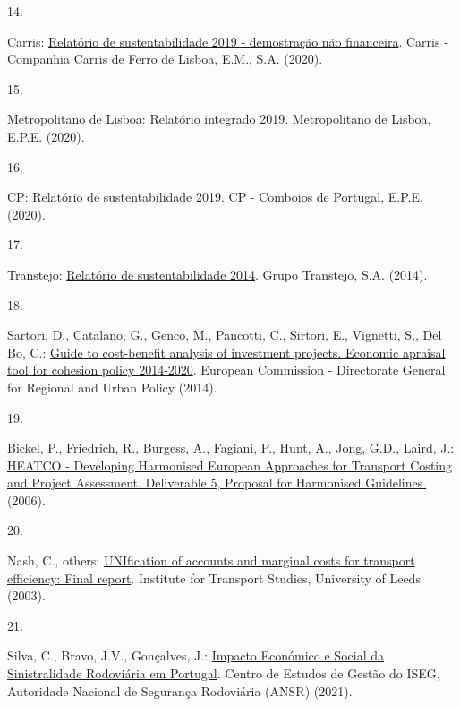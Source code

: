 \documentclass[runningheads]{llncs}
\newlength{\cslhangindent}
\newlength{\csllabelwidth}
\newlength{\cslentryspacingunit} %
\newenvironment{CSLReferences}[2] %
 {%
  \setlength{\parindent}{0pt}
  \ifodd #1
  \let\oldpar\par
  \def\par{\hangindent=\cslhangindent\oldpar}
  \fi
  \setlength{\parskip}{#2\cslentryspacingunit}
 }%
 {}
\newcommand{\CSLLeftMargin}[1]{\parbox[t]{\csllabelwidth}{#1}}
\newcommand{\CSLRightInline}[1]{\parbox[t]{\linewidth - \csllabelwidth}{#1}\break}
\begin{document}
\begin{CSLReferences}{0}{0}
\leavevmode{}%
\CSLLeftMargin{14. }%
\CSLRightInline{Carris:
\href{https://www.carris.pt/media/dkdp2wbg/dnf_carris2019_rv5.pdf}{Relatório
de sustentabilidade 2019 - demostração não financeira}. {Carris -
Companhia Carris de Ferro de Lisboa, E.M., S.A.} (2020).}

\leavevmode{}%
\CSLLeftMargin{15. }%
\CSLRightInline{Metropolitano de Lisboa:
\href{https://www.metrolisboa.pt/wp-content/uploads/2021/01/relatorio_integrado_2019.pdf}{Relatório
integrado 2019}. {Metropolitano de Lisboa, E.P.E.} (2020).}

\leavevmode{}%
\CSLLeftMargin{16. }%
\CSLRightInline{CP:
\href{https://www.cp.pt/StaticFiles/Institucional/2_gestao_sustentavel/1_RelatoriosSustentabilidade/relatorio-de-sustentabilidade-2019.pdf}{Relatório
de sustentabilidade 2019}. {CP - Comboios de Portugal, E.P.E.} (2020).}

\leavevmode{}%
\CSLLeftMargin{17. }%
\CSLRightInline{Transtejo:
\href{https://ttsl.pt/wp-content/uploads/2018/01/rs_2014_min.pdf}{Relatório
de sustentabilidade 2014}. {Grupo Transtejo, S.A.} (2014).}

\leavevmode{}%
\CSLLeftMargin{18. }%
\CSLRightInline{Sartori, D., Catalano, G., Genco, M., Pancotti, C.,
Sirtori, E., Vignetti, S., Del Bo, C.:
\href{https://ec.europa.eu/regional_policy/sources/docgener/studies/pdf/cba_guide.pdf}{Guide
to cost-benefit analysis of investment projects. Economic apraisal tool
for cohesion policy 2014-2020}. {European Commission - Directorate
General for Regional and Urban Policy} (2014).}

\leavevmode{}%
\CSLLeftMargin{19. }%
\CSLRightInline{Bickel, P., Friedrich, R., Burgess, A., Fagiani, P.,
Hunt, A., Jong, G.D., Laird, J.:
\href{https://trimis.ec.europa.eu/sites/default/files/project/documents/20130122_113653_88902_HEATCO_D5_summary.pdf}{{HEATCO
- Developing Harmonised European Approaches for Transport Costing and
Project Assessment. Deliverable 5, Proposal for Harmonised Guidelines.}}
(2006).}

\leavevmode{}%
\CSLLeftMargin{20. }%
\CSLRightInline{Nash, C., others:
\href{https://www.its.leeds.ac.uk/projects/unite/downloads/Unite\%20Final\%20Report.pdf}{UNIfication
of accounts and marginal costs for transport efficiency: Final report}.
{Institute for Transport Studies, University of Leeds} (2003).}

\leavevmode{}%
\CSLLeftMargin{21. }%
\CSLRightInline{Silva, C., Bravo, J.V., Gonçalves, J.:
\href{http://www.ansr.pt/Estatisticas/RelatoriosTematicos/Documents/O\%20Impacto\%20Economico\%20e\%20Social\%20da\%20Sinistralidade\%20-\%20PT.pdf}{{Impacto
Económico e Social da Sinistralidade Rodoviária em Portugal}}. {Centro
de Estudos de Gestão do ISEG, Autoridade Nacional de Segurança
Rodoviária (ANSR)} (2021).}

\end{CSLReferences}

%
\end{document}
